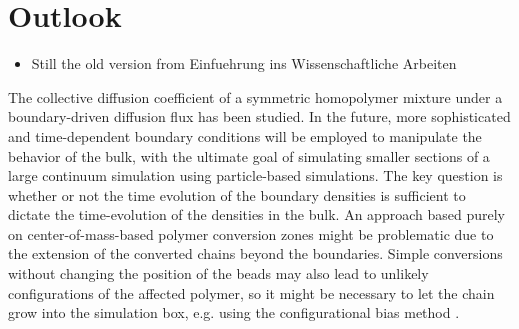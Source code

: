 \documentclass[bachelor,       %
               twoside,        %
               BCOR10mm,       %
               ngerman, english %
               ]{GAUBM}
\begin{document}




 
\chapter{Outlook}

\begin{itemize}
    \item Still the old version from Einfuehrung ins Wissenschaftliche Arbeiten
\end{itemize}

The collective diffusion coefficient of a symmetric homopolymer mixture under a boundary-driven diffusion flux has been studied. In the future, more sophisticated and time-dependent boundary conditions will be employed to manipulate the behavior of the bulk, with the ultimate goal of simulating smaller sections of a large continuum simulation using particle-based simulations. The key question is whether or not the time evolution of the boundary densities is sufficient to dictate the time-evolution of the densities in the bulk. An approach based purely on center-of-mass-based polymer conversion zones might be problematic due to the extension of the converted chains beyond the boundaries. Simple conversions without changing the position of the beads may also lead to unlikely configurations of the affected polymer, so it might be necessary to let the chain grow into the simulation box, e.g. using the configurational bias method \cite{ConfBias}.
\appendix
\end{document}
